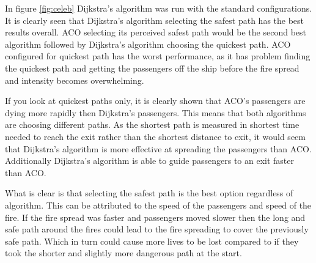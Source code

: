 In figure \ref{fig:celeb} Dijkstra's algorithm was run with the standard configurations. It is clearly seen that Dijkstra's algorithm selecting the safest path has the best results overall. ACO selecting its perceived safest path would be the second best algorithm followed by Dijkstra's algorithm choosing the quickest path. ACO configured for quickest path has the worst performance, as it has problem finding the quickest path and getting the passengers off the ship before the fire spread and intensity becomes overwhelming.

If you look at quickest paths only, it is clearly shown that ACO's passengers are dying more rapidly then Dijkstra's passengers. This means that both algorithms are choosing different paths. As the shortest path is measured in shortest time needed to reach the exit rather than the shortest distance to exit, it would seem that Dijkstra's algorithm is more effective at spreading the passengers than ACO. Additionally Dijkstra's algorithm is able to guide passengers to an exit faster than ACO.

What is clear is that selecting the safest path is the best option regardless of algorithm. This can be attributed to the speed of the passengers and speed of the fire. If the fire spread was faster and passengers moved slower then the long and safe path around the fires could lead to the fire spreading to cover the previously safe path. Which in turn could cause more lives to be lost compared to if they took the shorter and slightly more dangerous path at the start.



